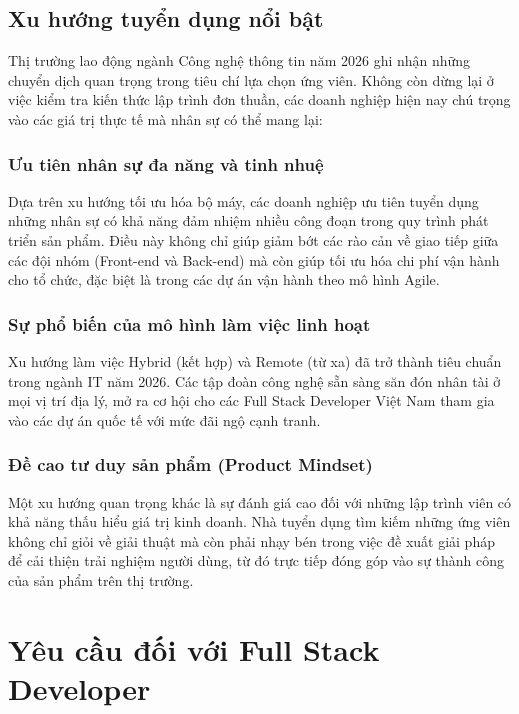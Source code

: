 \documentclass[12pt,a4paper]{article}
\begin{document}
\subsection{Xu hướng tuyển dụng nổi bật}

\hspace{0.7cm}Thị trường lao động ngành Công nghệ thông tin năm 2026 ghi nhận những chuyển dịch quan trọng trong tiêu chí lựa chọn ứng viên. Không còn dừng lại ở việc kiểm tra kiến thức lập trình đơn thuần, các doanh nghiệp hiện nay chú trọng vào các giá trị thực tế mà nhân sự có thể mang lại:

\subsubsection{Ưu tiên nhân sự đa năng và tinh nhuệ}
\hspace{0.7cm}Dựa trên xu hướng tối ưu hóa bộ máy, các doanh nghiệp ưu tiên tuyển dụng những nhân sự có khả năng đảm nhiệm nhiều công đoạn trong quy trình phát triển sản phẩm. Điều này không chỉ giúp giảm bớt các rào cản về giao tiếp giữa các đội nhóm (Front-end và Back-end) mà còn giúp tối ưu hóa chi phí vận hành cho tổ chức, đặc biệt là trong các dự án vận hành theo mô hình Agile.

\subsubsection{Sự phổ biến của mô hình làm việc linh hoạt}
\hspace{0.7cm}Xu hướng làm việc Hybrid (kết hợp) và Remote (từ xa) đã trở thành tiêu chuẩn trong ngành IT năm 2026. Các tập đoàn công nghệ sẵn sàng săn đón nhân tài ở mọi vị trí địa lý, mở ra cơ hội cho các Full Stack Developer Việt Nam tham gia vào các dự án quốc tế với mức đãi ngộ cạnh tranh.

\subsubsection{Đề cao tư duy sản phẩm (Product Mindset)}
\hspace{0.7cm}Một xu hướng quan trọng khác là sự đánh giá cao đối với những lập trình viên có khả năng thấu hiểu giá trị kinh doanh. Nhà tuyển dụng tìm kiếm những ứng viên không chỉ giỏi về giải thuật mà còn phải nhạy bén trong việc đề xuất giải pháp để cải thiện trải nghiệm người dùng, từ đó trực tiếp đóng góp vào sự thành công của sản phẩm trên thị trường.

\section{Yêu cầu đối với Full Stack Developer}
\end{document}
